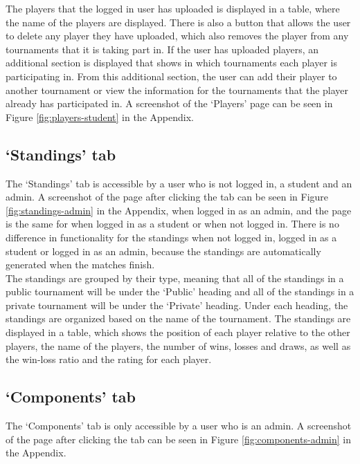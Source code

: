 \documentclass[a4paper, 12pt]{report}
\begin{document}
The players that the logged in user has uploaded is displayed in a table, where
the name of the players are displayed. There is also a button that allows the
user to delete any player they have uploaded, which also removes the player from
any tournaments that it is taking part in. If the user has uploaded players, an
additional section is displayed that shows in which tournaments each player is
participating in. From this additional section, the user can add their player
to another tournament or view the information for the tournaments that the player
already has participated in. A screenshot of the `Players' page can be seen in
Figure \ref{fig:players-student} in the Appendix.

\subsection{`Standings' tab}
\label{sec:impl-tab-standings}

The `Standings' tab is accessible by a user who is not logged in, a student
and an admin. A screenshot of the page after clicking the tab can be seen in
Figure \ref{fig:standings-admin} in the Appendix, when logged in as an admin,
and the page is the same for when logged in as a student or when not logged in.
There is no difference in functionality for the standings when not logged in,
logged in as a student or logged in as an admin, because the standings are
automatically generated when the matches finish. \\

The standings are grouped by their type, meaning that all of the standings in a
public tournament will be under the `Public' heading and all of the standings in
a private tournament will be under the `Private' heading. Under each heading, the
standings are organized based on the name of the tournament. The standings are
displayed in a table, which shows the position of each player relative to the
other players, the name of the players, the number of wins, losses and draws, as
well as the win-loss ratio and the rating for each player.

\subsection{`Components' tab}
\label{sec:impl-tab-components}

The `Components' tab is only accessible by a user who is an admin. A screenshot
of the page after clicking the tab can be seen in Figure \ref{fig:components-admin}
in the Appendix. \\
\end{document}

